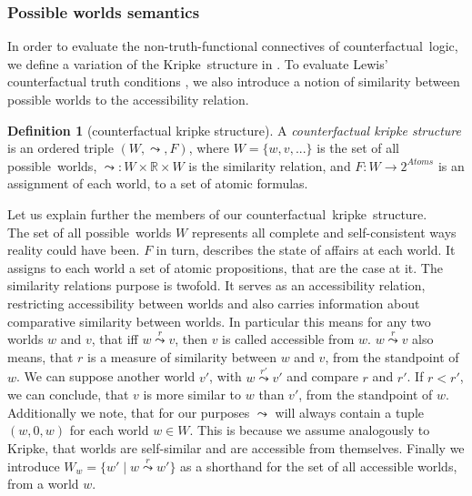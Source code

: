 \documentclass[a4paper,american]{paper}
\theoremstyle{definition}\newtheorem{definition}{Definition}
\begin{document}
\subsubsection{Possible worlds semantics}
In order to evaluate the non-truth-functional connectives of counterfactual~logic, we define a variation of the Kripke~structure in \cite{kripke_modal_logic_1963}. To evaluate Lewis' counterfactual truth conditions \cite{lewis_counterfactuals_1973}, we also introduce a notion of similarity between possible worlds to the accessibility relation.
\begin{definition}[counterfactual kripke structure]
A {\it counterfactual kripke structure} is an ordered triple $(W, \leadsto ,F)$, where $W=\{w,v,...\}$ is the set of all possible~worlds, $\leadsto \colon W\times \mathbb{R} \times W$ is the similarity relation, and $F \colon W \rightarrow 2^{Atoms}$ is an assignment of each world, to a set of atomic formulas.
\end{definition}
\noindent Let us explain further the members of our counterfactual~kripke~structure.\\
The set of all possible~worlds $W$ represents all complete and self-consistent ways reality could have been. $F$ in turn, describes the state of affairs at each world. It assigns to each world a set of atomic propositions, that are the case at it. The similarity relations purpose is twofold. It serves as an accessibility relation, restricting accessibility between worlds and also carries information about comparative similarity between worlds. In particular this means for any two worlds $w$ and $v$, that iff $w\overset{r}{\leadsto} v$, then $v$ is called accessible from $w$. $w\overset{r}{\leadsto} v$ also means, that $r$ is a measure of similarity between $w$ and $v$, from the standpoint of $w$. We can suppose another world $v'$, with $w\overset{r'}{\leadsto} v'$ and compare $r$ and $r'$. If $r < r'$, we can conclude, that $v$ is more similar to $w$ than $v'$, from the standpoint of $w$. Additionally we note, that for our purposes $\leadsto$ will always contain a tuple $(w, 0, w)$ for each world $w\in W$. This is because we assume analogously to Kripke, that worlds are self-similar and are accessible from themselves. Finally we introduce $W_w = \{w'\mid w \overset{r}{\leadsto} w'\}$ as a shorthand for the set of all accessible worlds, from a world $w$.
\newpage
\end{document}
